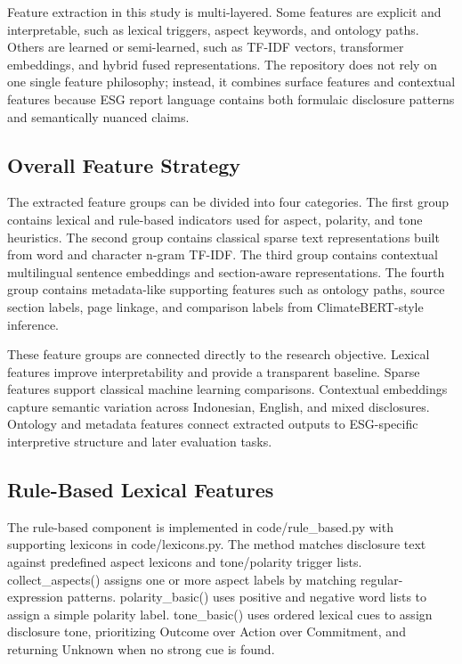 \documentclass[english, online, cse, master]{dithesis}
\begin{document}
Feature extraction in this study is multi-layered. Some features are explicit and interpretable, such as lexical triggers, aspect keywords, and ontology paths. Others are learned or semi-learned, such as TF-IDF vectors, transformer embeddings, and hybrid fused representations. The repository does not rely on one single feature philosophy; instead, it combines surface features and contextual features because ESG report language contains both formulaic disclosure patterns and semantically nuanced claims.

\subsection{Overall Feature Strategy}

The extracted feature groups can be divided into four categories. The first group contains lexical and rule-based indicators used for aspect, polarity, and tone heuristics. The second group contains classical sparse text representations built from word and character n-gram TF-IDF. The third group contains contextual multilingual sentence embeddings and section-aware representations. The fourth group contains metadata-like supporting features such as ontology paths, source section labels, page linkage, and comparison labels from ClimateBERT-style inference.

These feature groups are connected directly to the research objective. Lexical features improve interpretability and provide a transparent baseline. Sparse features support classical machine learning comparisons. Contextual embeddings capture semantic variation across Indonesian, English, and mixed disclosures. Ontology and metadata features connect extracted outputs to ESG-specific interpretive structure and later evaluation tasks.

\subsection{Rule-Based Lexical Features}

The rule-based component is implemented in code/rule\_based.py with supporting lexicons in code/lexicons.py. The method matches disclosure text against predefined aspect lexicons and tone/polarity trigger lists. collect\_aspects() assigns one or more aspect labels by matching regular-expression patterns. polarity\_basic() uses positive and negative word lists to assign a simple polarity label. tone\_basic() uses ordered lexical cues to assign disclosure tone, prioritizing Outcome over Action over Commitment, and returning Unknown when no strong cue is found.
\end{document}
